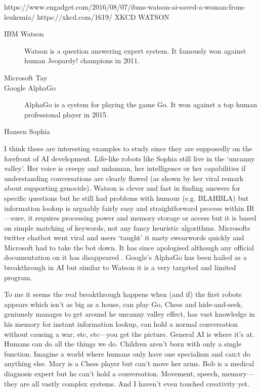 https://www.engadget.com/2016/08/07/ibms-watson-ai-saved-a-woman-from-leukemia/
https://xkcd.com/1619/ XKCD WATSON

\begin{description}
  \item[IBM Watson] Watson is a question answering expert system. It famously won against human Jeopardy! champions in 2011.
  \item[Microsoft Tay] 
  \item[Google AlphaGo] AlphaGo is a system for playing the game Go. It won against a top human professional player in 2015.
  \item[Hansen Sophia]
\end{description}

I think these are interesting examples to study since they are supposedly on the forefront of \ac{AI} development. Life-like robots like Sophia still live in the `uncanny valley'. Her voice is creepy and unhuman, her intelligence or her capabilities if understanding conversations are clearly flawed (as shown by her viral remark about supporting genocide). Watson is clever and fast in finding answers for specific questions but he still had problems with humour (e.g. BLAHBLA) but information lookup is arguably fairly easy and straightforward process within \ac{IR}---sure, it requires processing power and memory storage or access but it is based on simple matching of keywords, not any fancy heuristic algorithms. Microsofts twitter chatbot went viral and users `taught' it nasty swearwords  quickly and Microsoft had to take the bot down. It has since apologised although any official documentation on it has disappeared . Google's AlphaGo has been hailed as a breakthrough in \ac{AI} but similar to Watson it is a very targeted and limited program. 

To me it seems the real breakthrough happens when (and if) the first robots appears which isn't as big as a house, can play Go, Chess and hide-and-seek, geniunely manages to get around he uncanny valley effect, has vast knowledge in his memory for instant information lookup, can hold a normal conversation without causing a war, etc, etc---you get the picture. General \ac{AI} is where it's at. Humans can do all the things we do. Children aren't born with only a single function. Imagine a world where humans only have one specialism and can;t do anything else. Mary is a Chess player but can't move her arms. Bob is a medical diagnosis expert but he can't hold a conversation. Movement, speech, memory---they are all vastly complex systems. And I haven't even touched creativity yet.

